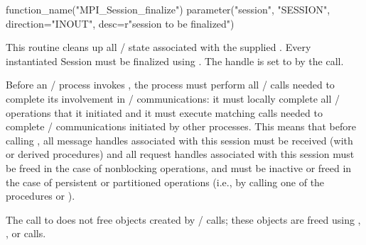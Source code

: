 \begin{mpi-binding}
    function_name("MPI_Session_finalize")
    parameter("session", "SESSION", direction="INOUT", desc=r"session to be finalized")
\end{mpi-binding}

\noindent
This routine cleans up all \MPI/ state associated with the supplied .
Every instantiated Session must be finalized using .
The handle  is set to  by the call.

Before an \MPI/ process invokes , the process must
perform all \MPI/ calls needed to complete its
involvement in \MPI/ communications: it must locally complete all
\MPI/ operations that it initiated and it must execute matching calls needed to complete \MPI/
communications initiated by other processes.
This means that before calling , all message handles associated
with this session must be received
(with  or derived procedures)
and all request handles associated with this session must be freed
in the case of nonblocking operations,
and must be inactive or freed in the case of persistent or partitioned operations
(i.e., by calling one of the procedures
%
%
%
%
%
%
%
%
or ).

The call to  does not free objects created by
\MPI/ calls; these objects are freed using
%
%
%
%
%
%
%
%
,
, or
 calls.

